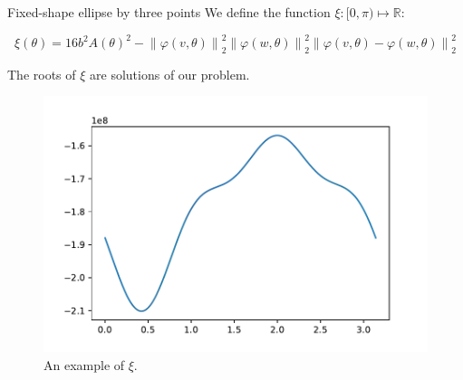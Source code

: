 \documentclass{beamer}
\newcommand{\R}{\mathbb{R}}
\newcommand{\norm}[2][2]{\left\lVert#2\right\rVert_{#1}}
\begin{document}
\begin{frame}{Fixed-shape ellipse by three points}
We define the function $\xi : [0, \pi) \mapsto \R$:

	\begin{equation*}
	\xi(\theta) = 16b^2A(\theta)^2 - \norm{\varphi(v, \theta)}^2\norm{\varphi(w, \theta)}^2\norm{\varphi(v, \theta)-\varphi(w, \theta)}^2
	\end{equation*}
	
The roots of $\xi$ are solutions of our problem.
	\begin{figure}
	\centering

	\includegraphics[scale=.5]{036}
	\caption{An example of $\xi$.}
\end{figure}
\end{frame}
\end{document}
